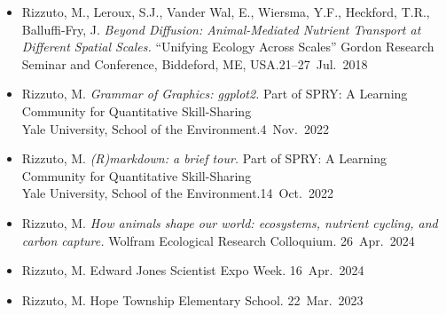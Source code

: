 
\begin{itemize}
  \item \textcolor{awesome}{Rizzuto, M.}, Leroux, S.J., Vander Wal, E., Wiersma, Y.F., Heckford, T.R., Balluffi-Fry, J. \emph{Beyond Diffusion: Animal-Mediated Nutrient Transport at Different Spatial Scales.} ``Unifying Ecology Across Scales'' Gordon Research Seminar and Conference, Biddeford, ME, USA.\hfill 21--27~Jul.~2018
\end{itemize}


\begin{itemize}
  \item \textcolor{awesome}{Rizzuto, M.} \emph{Grammar of Graphics: ggplot2.} Part of SPRY: A Learning Community for Quantitative Skill-Sharing\\ Yale University, School of the Environment.\hfill 4~Nov.~2022
  \item \textcolor{awesome}{Rizzuto, M.} \emph{(R)markdown: a brief tour.} Part of SPRY: A Learning Community for Quantitative Skill-Sharing\\ Yale University, School of the Environment.\hfill 14~Oct.~2022
\end{itemize}


\begin{itemize}
  \item \textcolor{awesome}{Rizzuto, M.} \emph{How animals shape our world: ecosystems, nutrient cycling, and carbon capture.} Wolfram Ecological Research Colloquium. \hfill 26~Apr.~2024
\end{itemize}


\begin{itemize}
  \item \textcolor{awesome}{Rizzuto, M.} Edward Jones Scientist Expo Week. \hfill 16~Apr.~2024
  \item \textcolor{awesome}{Rizzuto, M.} Hope Township Elementary School. \hfill 22~Mar.~2023
\end{itemize}

